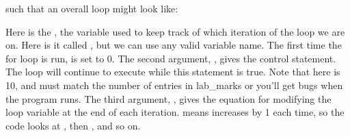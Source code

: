 \documentclass[letterpaper,10pt,british]{sphinxmanual}
\begin{document}
\sphinxAtStartPar
such that an overall loop might look like:

\begin{sphinxVerbatim}[commandchars=\\\{\},numbers=left,firstnumber=1,stepnumber=1]
\PYG{p}{[}\PYG{p}{]}
\PYG{p}{[}\PYG{p}{]}
\end{sphinxVerbatim}

\sphinxAtStartPar
Here  is the , the variable used to keep track of which iteration of the loop we are on. Here is it called , but we can use any valid variable name. The first time the for loop is run,  is set to 0. The second argument, , gives the control statement. The loop will continue to execute while this statement is true. Note that here  is 10, and must match the number of entries in lab\_marks or you’ll get bugs when the program runs. The third argument, , gives the equation for modifying the loop variable at the end of each iteration.  means  increases by 1 each time, so the code looks at , then , and so on.
\end{document}
